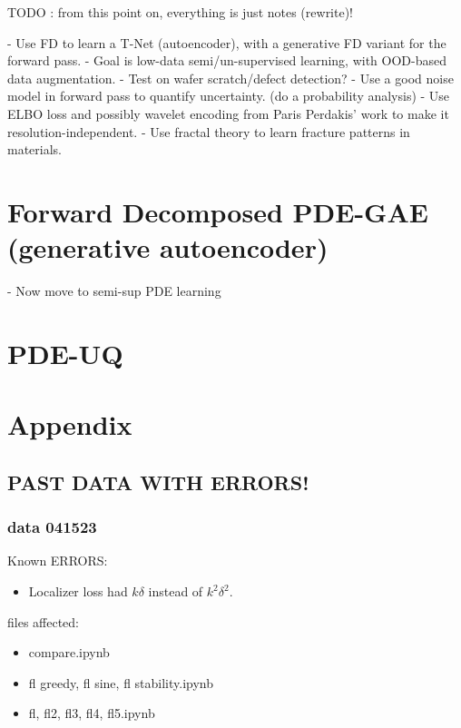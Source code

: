 \documentclass[12pt]{iopart}
\theoremstyle{break}
\newcommand*{\sfig}[2]{\begin{figure}[htpb]\centering\subfloat[#2]{\texttt{[image: \#1]}}\end{figure}}
\begin{document}
TODO : from this point on, everything is just notes (rewrite)! 
	
	
\newpage
	
- Use FD to learn a T-Net (autoencoder), with a generative FD variant for the forward pass.
- Goal is low-data semi/un-supervised learning, with OOD-based data augmentation.
- Test on wafer scratch/defect detection?
- Use a good noise model in forward pass to quantify uncertainty. (do a probability analysis)
- Use ELBO loss and possibly wavelet encoding from Paris Perdakis' work to make it resolution-independent.
- Use fractal theory to learn fracture patterns in materials.
	
\section{Forward Decomposed PDE-GAE (generative autoencoder)}
- Now move to semi-sup PDE learning
	
\section{PDE-UQ}
	
\section{Appendix}
\subsection{PAST DATA WITH ERRORS!}
\subsubsection{data 041523}
Known ERRORS:
\begin{itemize}
	    \item Localizer loss had $k\delta$ instead of $k^2 \delta^2$. 
\end{itemize}
files affected:
	
\begin{itemize}
\item compare.ipynb
\item fl greedy, fl sine, fl stability.ipynb
\item fl, fl2, fl3, fl4, fl5.ipynb
\end{itemize}
	
\end{document}
